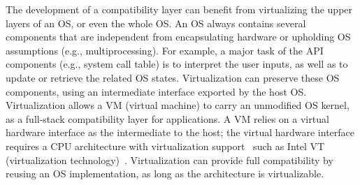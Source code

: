 %



The development of a compatibility layer
can benefit from virtualizing the upper layers of an OS, or even the whole OS.
An OS always contains
several components that are independent from
encapsulating hardware or upholding OS assumptions (e.g., multiprocessing).
For example, a major task of the API components
(e.g., system call table)
is to interpret the user inputs,
as well as to update or retrieve the related OS states.
Virtualization can preserve these OS components,
using an intermediate interface
exported by the host OS.
Virtualization allows a VM (virtual machine) to carry an unmodified OS kernel,
as a full-stack compatibility layer
for applications.
A VM relies on a virtual hardware interface as the intermediate
to the host;
the virtual hardware interface requires a CPU architecture with virtualization support~\cite{popek74virtual}
such as Intel VT (virtualization technology)~\cite{VT}.
Virtualization can provide full compatibility
by reusing an OS implementation,
as long as the architecture is virtualizable.





